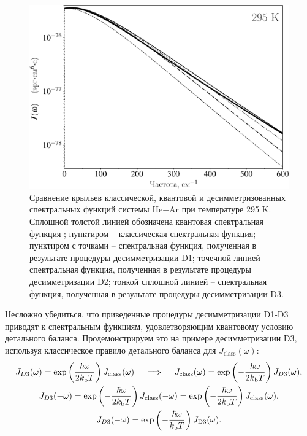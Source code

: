 \begin{figure}
    \centering
    \includegraphics[width=0.7\linewidth]{./pictures/two_atom_spectra/spectral_function_desymmetrizations-crop.pdf}
    \caption{Сравнение крыльев классической, квантовой и десимметризованных спектральных функций системы He$-$Ar при температуре 295 K. Сплошной толстой линией обозначена квантовая спектральная функция \cite{buryak2014}; пунктиром -- классическая спектральная функция; пунктиром с точками -- спектральная функция, полученная в результате процедуры десимметризации D1; точечной линией -- спектральная функция, полученная в результате процедуры десимметризации D2; тонкой сплошной линией -- спектральная функция, полученная в результате процедуры десимметризации D3.}
    \label{fig:desymmetrisation-spectral-functions}
\end{figure}

Несложно убедиться, что приведенные процедуры десимметризации D1-D3 приводят к спектральным функциям, удовлетворяющим квантовому условию детального баланса. Продемонстрируем это на примере десимметризации D3, используя классическое правило детального баланса для $J_\text{class}(\omega)$:
\begin{gather}
    J_{D3}(\omega) = \exp \left( \frac{\hbar \omega}{2 k_\text{b} T} \right) J_\text{class}(\omega) \quad \implies \quad J_\text{class}(\omega) = \exp \left( -\frac{\hbar \omega}{2 k_\text{b} T} \right) J_{D3}(\omega), \\
    J_{D3}(-\omega) = \exp \left( -\frac{\hbar \omega}{2 k_\text{b} T} \right) J_\text{class}(-\omega) = \exp \left( -\frac{\hbar \omega}{2 k_\text{b} T} \right) J_\text{class}(\omega), \\
    J_{D3}(-\omega) = \exp \left( -\frac{\hbar \omega}{k_\text{b} T} \right) J_\text{D3}(\omega).
\end{gather}


